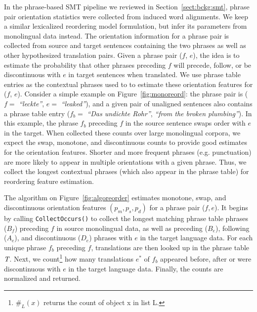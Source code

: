 \documentclass[11pt]{article}
\newcommand{\mnote}[1]{\marginpar{%
  \vskip-\baselineskip
  \raggedright\footnotesize
  \itshape\hrule\smallskip\tiny{#1}\par\smallskip\hrule}}
\newcommand{\mtodo}[1]{\mnote{\textcolor{red}{#1}}}
\newcommand{\secref}[1]{Section~\ref{#1}}
\newcommand{\figref}[1]{Figure~\ref{#1}}
\newcommand{\emq}[1]{\emph{``#1''}}
\begin{document}
In the phrase-based SMT pipeline we reviewed in \secref{sect:bckg:smt}, phrase pair orientation statistics were collected from induced word alignments.  We keep a similar lexicalized reordering model formulation, but infer its parameters from monolingual data instead.  The orientation information for a phrase pair is collected from source and target sentences containing the two phrases as well as other hypothesized translation pairs.  Given a phrase pair ($f$, $e$), the idea is to estimate the probability that other phrases preceding $f$ will precede, follow, or be discontinuous with $e$ in target sentences when translated.  We use phrase table entries as the contextual phrases used to to estimate these orientation features for ($f$, $e$). Consider a simple example on \figref{fig:monoreord}: the phrase pair is ($f =$ \emq{leckte}, $e =$ \emq{leaked}), and a given pair of unaligned sentences also contains a phrase table entry ($f_{b} =$ \emq{Das undichte Rohr}, \emq{from the broken plumbing}).  In this example, the phrase $f_{b}$ preceding $f$ in the source sentence swaps order with $e$ in the target.  When collected these counts over large monolingual corpora, we expect the swap, monotone, and discontinuous counts to provide good estimates for the orientation features.  
Shorter and more frequent phrases (e.g. punctuation) are more likely to appear in multiple orientations with a given phrase.  Thus, we collect the longest contextual phrases (which also appear in the phrase table) for reordering feature estimation.

The algorithm on \figref{fig:algoreorder} estimates monotone, swap, and discontinuous orientation features $(p_m, p_s, p_d)$ for a phrase pair ($f, e$).  It begins by calling {\tt \small CollectOccurs()} to collect the longest matching phrase table phrases ($B_f$) preceding $f$ in source monolingual data, as well as preceding ($B_e$), following ($A_e$), and discontinuous ($D_e$) phrases with $e$ in the target language data.  For each unique phrase $f_{b}$ preceding $f$, translations are then looked up in the phrase table $\emph{T}$.  Next, we count\footnote{$\#_{L}(x)$ returns the count of object x in list L.} how many translations $e^*$ of $f_b$ appeared before, after or were discontinuous with $e$ in the target language data.  Finally, the counts are normalized and returned. \mtodo{Be more specific about the out-of-order counts?}  %
\end{document}
